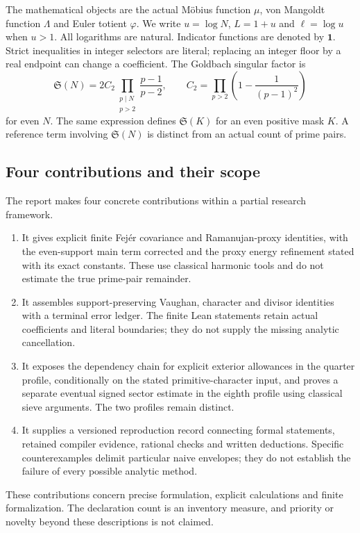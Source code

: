 \documentclass[11pt,a4paper]{article}
\theoremstyle{definition}
\theoremstyle{remark}
\newcommand{\ind}{\mathbf1}
\newcommand{\Sing}{\mathfrak S}
\begin{document}
The mathematical objects are the actual M\"obius function $\mu$, von Mangoldt function $\Lambda$ and Euler totient $\varphi$. We write $u=\log N$, $L=1+u$ and $\ell=\log u$ when $u>1$. All logarithms are natural. Indicator functions are denoted by $\ind$. Strict inequalities in integer selectors are literal; replacing an integer floor by a real endpoint can change a coefficient. The Goldbach singular factor is
\begin{equation}\label{eq:singular-definition}
 \Sing(N)=2C_2\prod_{\substack{p\mid N\\p>2}}\frac{p-1}{p-2},\qquad
 C_2=\prod_{p>2}\left(1-\frac1{(p-1)^2}\right)
\end{equation}
for even $N$. The same expression defines $\Sing(K)$ for an even positive mask $K$. A reference term involving $\Sing(N)$ is distinct from an actual count of prime pairs.

\subsection{Four contributions and their scope}
The report makes four concrete contributions within a partial research framework.
\begin{enumerate}
\item It gives explicit finite Fej\'er covariance and Ramanujan-proxy identities, with the even-support main term corrected and the proxy energy refinement stated with its exact constants. These use classical harmonic tools and do not estimate the true prime-pair remainder.
\item It assembles support-preserving Vaughan, character and divisor identities with a terminal error ledger. The finite Lean statements retain actual coefficients and literal boundaries; they do not supply the missing analytic cancellation.
\item It exposes the dependency chain for explicit exterior allowances in the quarter profile, conditionally on the stated primitive-character input, and proves a separate eventual signed sector estimate in the eighth profile using classical sieve arguments. The two profiles remain distinct.
\item It supplies a versioned reproduction record connecting formal statements, retained compiler evidence, rational checks and written deductions. Specific counterexamples delimit particular naive envelopes; they do not establish the failure of every possible analytic method.
\end{enumerate}
These contributions concern precise formulation, explicit calculations and finite formalization. The declaration count is an inventory measure, and priority or novelty beyond these descriptions is not claimed.
\end{document}
